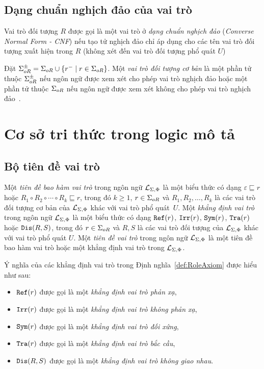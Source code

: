 \subsection{Dạng chuẩn nghịch đảo của vai trò}
\label{sec:Chap1.InverseNormalForm}
Vai trò đối tượng $R$ được gọi là một vai trò ở {\em dạng chuẩn nghịch đảo} ({\em Converse Normal Form - CNF}) nếu tạo tử nghịch đảo chỉ áp dụng cho các tên vai trò đối tượng xuất hiện trong $R$ (không xét đến vai trò đối tượng phổ quát $U$)

Đặt $\Sigma_{oR}^\pm = \Sigma_{oR} \cup \{r^- \mid r \in \Sigma_{oR}\}$. Một {\em vai trò đối tượng cơ bản} là một phần tử thuộc $\Sigma_{oR}^\pm$ nếu ngôn ngữ được xem xét cho phép vai trò nghịch đảo hoặc một phần tử thuộc $\Sigma_{oR}$ nếu ngôn ngữ được xem xét không cho phép vai trò nghịch đảo~\cite{Divroodi2011B}.

\section{Cơ sở tri thức trong logic mô tả}
\label{sec:Chap1.KnowledgeBaseInDL}

\subsection{Bộ tiên đề vai trò}
\label{sec:Chap1.RBox}
\begin{Definition}
\label{def:RoleAxiom}
	Một {\em tiên đề bao hàm vai trò} trong ngôn ngữ $\mathcal{L}_{\Sigma,\Phi}$ là một biểu thức có dạng $\varepsilon \sqsubseteq r$ hoặc $R_1 \circ R_2 \circ \cdots \circ R_k \sqsubseteq r$, trong đó $k \geq 1$, $r \in \Sigma_{oR}$ và $R_1, R_2, \ldots,R_k$ là các vai trò đối tượng cơ bản của $\mathcal{L}_{\Sigma,\Phi}$ khác với vai trò phổ quát~$U$. 
%
	Một {\em khẳng định vai trò} trong ngôn ngữ $\mathcal{L}_{\Sigma,\Phi}$ là một biểu thức có dạng $\mathtt{Ref}(r)$, $\mathtt{Irr}(r)$, $\mathtt{Sym}(r)$, $\mathtt{Tra}(r)$ hoặc $\mathtt{Dis}(R, S)$, trong đó $r \in \Sigma_{oR}$ và $R, S$ là các vai trò đối tượng của $\mathcal{L}_{\Sigma,\Phi}$ khác với vai trò phổ quát $U$.
%
	Một {\em tiên đề vai trò} trong ngôn ngữ $\mathcal{L}_{\Sigma,\Phi}$ là một tiên đề bao hàm vai trò hoặc một khẳng định vai trò trong $\mathcal{L}_{\Sigma,\Phi}$.\myend
\end{Definition}

Ý nghĩa của các khẳng định vai trò trong Định nghĩa~\ref{def:RoleAxiom} được hiểu như sau:
\begin{itemize}
	\item $\mathtt{Ref}(r)$ được gọi là một {\em khẳng định vai trò phản xạ},
	\item $\mathtt{Irr}(r)$ được gọi là một {\em khẳng định vai trò không phản xạ},
	\item $\mathtt{Sym}(r)$ được gọi là một {\em khẳng định vai trò đối xứng},
	\item $\mathtt{Tra}(r)$ được gọi là một {\em khẳng định vai trò bắc cầu},
	\item $\mathtt{Dis}(R,S)$ được gọi là một {\em khẳng định vai trò không giao nhau}.        
\end{itemize}

